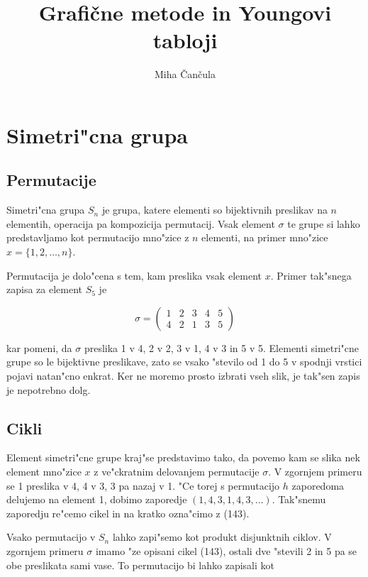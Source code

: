 \documentclass[a4paper,10pt]{article}
\author{Miha \v Can\v cula}
\title{Grafi\v cne metode in Youngovi tabloji}
\begin{document}
\maketitle

\section{Simetri"cna grupa}

\subsection{Permutacije}

Simetri"cna grupa $S_n$ je grupa, katere elementi so bijektivnih preslikav na $n$ elementih, operacija pa kompozicija permutacij. Vsak element $\sigma$ te grupe si lahko predstavljamo kot permutacijo mno"zice z $n$ elementi, na primer mno"zice $x = \{1, 2, \ldots, n\}$. 

Permutacija je dolo"cena s tem, kam preslika vsak element $x$. Primer tak"snega zapisa za element $S_5$ je

$$
\sigma = \begin{pmatrix} 1 & 2 & 3 & 4 & 5 \\ 4 & 2 & 1 & 3 & 5\end{pmatrix}
$$

kar pomeni, da $\sigma$ preslika 1 v 4, 2 v 2, 3 v 1, 4 v 3 in 5 v 5. Elementi simetri"cne grupe so le bijektivne preslikave, zato se vsako "stevilo od 1 do 5 v spodnji vrstici pojavi natan"cno enkrat. Ker ne moremo prosto izbrati vseh slik, je tak"sen zapis je nepotrebno dolg. 

\subsection{Cikli}

Element simetri"cne grupe kraj"se predstavimo tako, da povemo kam se slika nek element mno"zice $x$ z ve"ckratnim delovanjem permutacije $\sigma$. V zgornjem primeru se 1 preslika v 4, 4 v 3, 3 pa nazaj v 1. "Ce torej s permutacijo $h$ zaporedoma delujemo na element 1, dobimo zaporedje $(1, 4, 3, 1, 4, 3, \ldots)$. Tak"snemu zaporedju re"cemo cikel in na kratko ozna"cimo z (143). 

Vsako permutacijo v $S_n$ lahko zapi"semo kot produkt disjunktnih ciklov. V zgornjem primeru $\sigma$ imamo "ze opisani cikel (143), ostali dve "stevili 2 in 5 pa se obe preslikata sami vase. To permutacijo bi lahko zapisali kot
\end{document}
